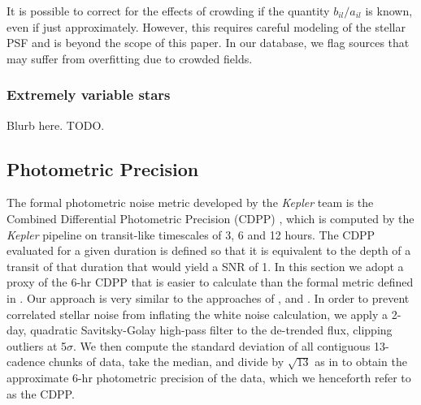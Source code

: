 \documentclass[]{emulateapj}
\newcommand{\note}[1]{{\color{red} #1}}
\begin{document}
It is possible to correct for the effects of crowding if the quantity $b_{il}/a_{il}$
is known, even if just approximately. However, this requires careful modeling of the
stellar PSF and is beyond the scope of this paper. In our database, we flag sources
that may suffer from overfitting due to crowded fields.

\subsubsection{Extremely variable stars}
\label{sec:variablestars}
\note{Blurb here. TODO.}

\subsection{Photometric Precision}
\label{sec:precision}
The formal photometric noise metric developed by the \emph{Kepler} team is the
Combined Differential Photometric Precision (CDPP) \citep{CHR12}, which is computed
by the \emph{Kepler} pipeline on transit-like timescales of 3, 6 and 12 hours.
The CDPP evaluated for a given duration is defined so that it is equivalent to the 
depth of a transit of that duration that would yield a SNR of 1. In this section we adopt a proxy 
of the 6-hr CDPP that is easier to calculate than
the formal metric defined in \cite{CHR12}. Our approach is very similar to the approaches
of \cite{GIL11}, \cite{VJ14} and \cite{AIG16}. In order to prevent correlated stellar
noise from inflating the white noise calculation, we apply a 2-day, quadratic Savitsky-Golay 
\citep{SG64} high-pass filter to the de-trended flux, clipping
outliers at 5$\sigma$. We then compute the standard deviation of all contiguous 13-cadence
chunks of data, take the median, and divide by $\sqrt{13}$ as in \cite{VJ14} to obtain
the approximate 6-hr photometric precision of the data, which we henceforth refer to
as the CDPP.
\end{document}
